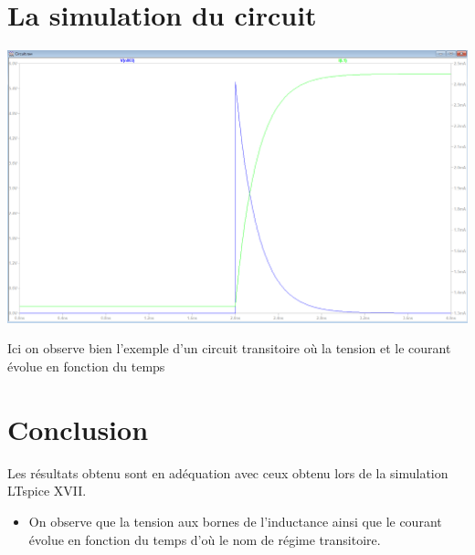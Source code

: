 \documentclass{homeworg}
\begin{document}
\section{La simulation du circuit}
\begin{center}
        \includegraphics[scale=0.3]{Simu.PNG}
\end{center}
Ici on observe bien l'exemple d'un circuit transitoire où la tension et le courant évolue en fonction du temps

\section{Conclusion}
    Les résultats obtenu sont en adéquation avec ceux obtenu lors de la simulation LTspice XVII.
    \begin{itemize}
        \item On observe que la tension aux bornes de l'inductance ainsi que le courant évolue en fonction du temps d'où le nom de régime transitoire.
    \end{itemize}
\end{document}

